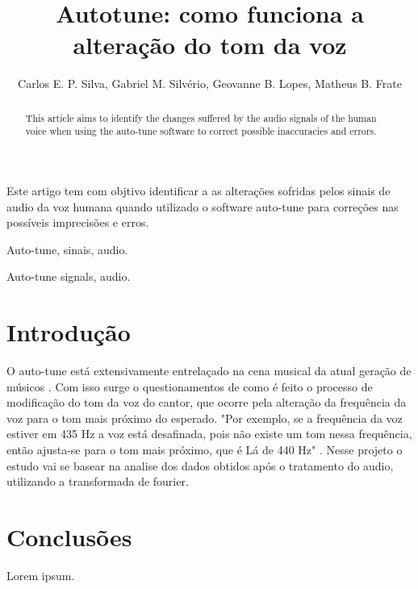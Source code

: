 \documentclass{sbrt}
\begin{document}
\title{Autotune: como funciona a alteração do tom da voz}

\author{Carlos E. P. Silva, Gabriel M. Silvério, Geovanne B. Lopes, Matheus B. Frate}

\maketitle


\begin{resumo}
Este artigo tem com objtivo identificar a as alterações sofridas pelos sinais de audio da voz humana quando utilizado o software auto-tune para correções nas possíveis imprecisões e erros.
\end{resumo}

\begin{chave}
Auto-tune, sinais, audio.
\end{chave}


\begin{abstract}
This article aims to identify the changes suffered by the audio signals of the human voice when using the auto-tune software to correct possible inaccuracies and errors.
\end{abstract}

\begin{keywords}
Auto-tune signals, audio.
\end{keywords}


\section{Introdução}

O auto-tune está extensivamente entrelaçado na cena musical da atual geração de músicos \cite{diaz2009fate}. Com isso surge o questionamentos de como é feito o processo de modificação do tom da voz do cantor, que ocorre pela alteração da frequência da voz para o tom mais próximo do esperado.
"Por exemplo, se a frequência da voz estiver em 435 Hz a voz está desafinada, pois não existe um tom nessa frequência, então ajusta-se para o tom mais próximo, que é Lá de 440 Hz" \cite{deimplementaccao}. Nesse projeto o estudo vai se basear na analise dos dados obtidos após o tratamento do audio, utilizando a transformada de fourier.


\section{Conclusões}

Lorem ipsum.





\end{document}
